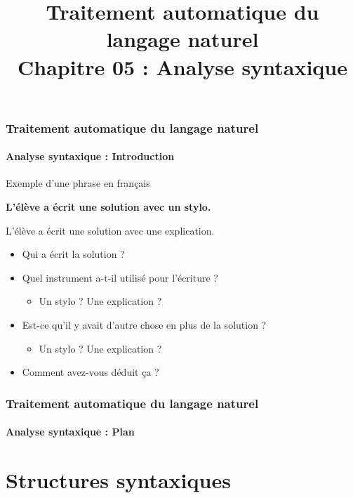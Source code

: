 \documentclass[xcolor=table]{beamer}
\title[TALN : 05- Analyse syntaxique]%
{Traitement automatique du langage naturel\\Chapitre 05 : Analyse syntaxique}
\begin{document}
	
\begin{frame}
\frametitle{Traitement automatique du langage naturel}
\framesubtitle{Analyse syntaxique : Introduction}

\begin{exampleblock}{Exemple d'une phrase en français}
	\begin{center}
		\Large\bfseries
		L'élève a écrit une solution avec un stylo. 
		
		L'élève a écrit une solution avec une explication.
	\end{center}
\end{exampleblock}

\begin{itemize}
	\item Qui a écrit la solution ?
	\item Quel instrument a-t-il utilisé pour l'écriture ?
	\begin{itemize}
		\item Un stylo ? Une explication ?
	\end{itemize}
	\item Est-ce qu'il y avait d'autre chose en plus de la solution ?
	\begin{itemize}
		\item Un stylo ? Une explication ?
	\end{itemize}
	\item Comment avez-vous déduit ça ?
\end{itemize}

\end{frame}

%
%

\begin{frame}
\frametitle{Traitement automatique du langage naturel}
\framesubtitle{Analyse syntaxique : Plan}

\begin{multicols}{2}
\tableofcontents
\end{multicols}
\end{frame}

\section{Structures syntaxiques}
\end{document}
